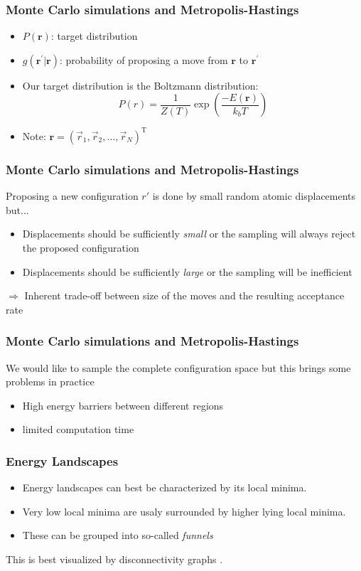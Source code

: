 \documentclass{beamer}
\begin{document}
  \begin{frame}
  	\frametitle{Monte Carlo simulations and Metropolis-Hastings}
  	\begin{itemize}
  		\item $P(\mathbf{r})$: target distribution
  		\item $g(\mathbf{r}^\prime|\mathbf{r})$: probability of proposing a move from $\mathbf{r}$ to $\mathbf{r}^\prime$
  		\item Our target distribution is the Boltzmann distribution:
  		\begin{equation}
  			P(r) = \frac{1}{Z(T)}\exp\left(\frac{-E(\mathbf{r})}{k_bT}\right)
  		\end{equation}
  		\item Note: $\mathbf{r} = (\vec{r}_1,\vec{r}_2, \ldots, \vec{r}_{N})^\text{T}$
  	\end{itemize}
  \end{frame}

  \begin{frame}
  \frametitle{Monte Carlo simulations and Metropolis-Hastings}
  	Proposing a new configuration $r'$ is done by small random atomic displacements but...
  	\begin{itemize}
 		\item Displacements should be sufficiently \emph{small} or the sampling will always reject the proposed configuration
   		\item Displacements should be sufficiently \emph{large} or the sampling will be inefficient
	\end{itemize}
	$\Longrightarrow$ Inherent trade-off between size of the moves and the resulting acceptance rate
  \end{frame}
	
	\begin{frame}
		\frametitle{Monte Carlo simulations and Metropolis-Hastings}
		We would like to sample the complete configuration space but this brings some problems in practice
		\begin{itemize}
			\item High energy barriers between different regions
			\item limited computation time
		\end{itemize}	
	\end{frame}

	\begin{frame}
		\frametitle{Energy Landscapes}
		\begin{itemize}
		\item Energy landscapes can best be characterized by its local minima.
		\item Very low local minima are usaly surrounded by higher lying local minima.
		\item These can be grouped into so-called \emph{funnels}
	\end{itemize}
	This is best visualized by disconnectivity graphs \cite{Wales2012}.
	\end{frame}
\end{document}
